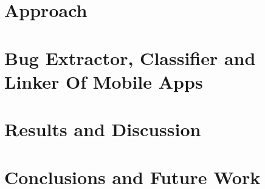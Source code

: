 \documentclass{seal_thesis}
\begin{document}
\chapter{Approach}
\label{sec:approach}


\chapter{\textbf{B}ug \textbf{E}xtractor, \textbf{C}lassifier and \textbf{L}inker \textbf{O}f \textbf{M}obile \textbf{A}pps}


\chapter{Results and Discussion}


\chapter{Conclusions and Future Work}





\backmatter


\end{document}
